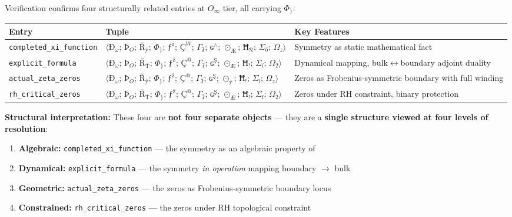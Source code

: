 \documentclass[12pt,a4paper]{article}
\begin{document}
Verification confirms four structurally related entries at $O_{\infty}$ tier, all carrying $\Phi_{\}}$:

\begin{table}[htbp]
\centering
\small
{}
\begin{tabularx}{\textwidth}{>{\centering\arraybackslash}X >{\centering\arraybackslash}X >{\centering\arraybackslash}X}
\toprule
\rowcolor{gray!25}\textbf{Entry} & \textbf{Tuple} & \textbf{Key Features} \\
\midrule
\rowcolors{1}{white}{gray!10}
\texttt{completed\_xi\_function} & $\langle \text{Ð}_{\omega};\, \text{Þ}_{O};\, \text{Ř}_{\text{ý}};\, \Phi_{\}};\, \text{ƒ}^{\text{ż}};\, \text{Ç}^{W};\, \Gamma_{\text{ʔ}};\, \text{ɢ}^{\wedge};\, \odot_{\text{Æ}};\, \text{Ħ}_{\text{Ñ}};\, \Sigma_{\text{ő}};\, \Omega_{z} \rangle$ & Symmetry as static mathematical fact \\
\texttt{explicit\_formula} & $\langle \text{Ð}_{\omega};\, \text{Þ}_{O};\, \text{Ř}_{\text{Ť}};\, \Phi_{\}};\, \text{ƒ}^{\text{ż}};\, \text{Ç}^{@};\, \Gamma_{\text{ʔ}};\, \text{ɢ}^{\text{Ş}};\, \odot_{\text{Æ}};\, \text{Ħ}_{!};\, \Sigma_{\text{ï}};\, \Omega_{2} \rangle$ & Dynamical mapping, bulk$\leftrightarrow$boundary adjoint duality \\
\texttt{actual\_zeta\_zeros} & $\langle \text{Ð}_{\omega};\, \text{Þ}_{O};\, \text{Ř}_{\text{ý}};\, \Phi_{\}};\, \text{ƒ}^{\text{ż}};\, \text{Ç}^{@};\, \Gamma_{\text{ʔ}};\, \text{ɢ}^{\text{Ş}};\, \odot_{\text{ÿ}};\, \text{Ħ}_{!};\, \Sigma_{\text{ï}};\, \Omega_{z} \rangle$ & Zeros as Frobenius-symmetric boundary with full winding \\
\texttt{rh\_critical\_zeros} & $\langle \text{Ð}_{\omega};\, \text{Þ}_{O};\, \text{Ř}_{\text{Ť}};\, \Phi_{\}};\, \text{ƒ}^{\text{ż}};\, \text{Ç}^{@};\, \Gamma_{\text{ʔ}};\, \text{ɢ}^{\text{Ş}};\, \odot_{\text{Æ}};\, \text{Ħ}_{!};\, \Sigma_{\text{ï}};\, \Omega_{2} \rangle$ & Zeros under RH constraint, binary protection \\
\bottomrule
\end{tabularx}
\end{table}

\textbf{Structural interpretation:} These four are \textbf{not four separate objects} --- they are a \textbf{single structure viewed at four levels of resolution}:

\begin{enumerate}
    \item \textbf{Algebraic:} \texttt{completed\_xi\_function} --- the symmetry as an algebraic property of \xi
    \item \textbf{Dynamical:} \texttt{explicit\_formula} --- the symmetry \emph{in operation} mapping boundary $\rightarrow$ bulk
    \item \textbf{Geometric:} \texttt{actual\_zeta\_zeros} --- the zeros as Frobenius-symmetric boundary locus
    \item \textbf{Constrained:} \texttt{rh\_critical\_zeros} --- the zeros under RH topological constraint
\end{enumerate}
\end{document}
